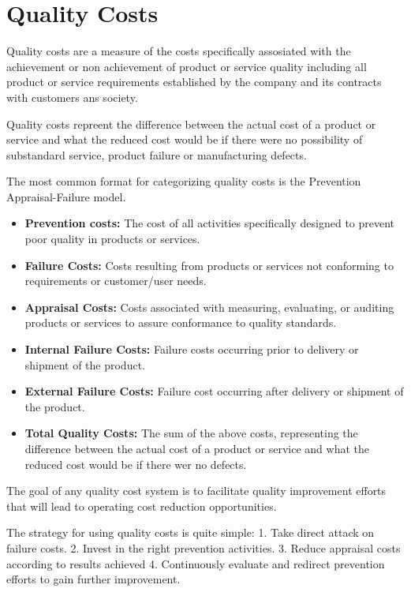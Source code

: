 \documentclass[11pt]{article}
\providecommand{\tightlist}{%
      \setlength{\itemsep}{0pt}\setlength{\parskip}{0pt}}
\begin{document}
    \hypertarget{quality-costs}{%
\section{Quality Costs}\label{quality-costs}}

    Quality costs are a measure of the costs specifically assosiated with
the achievement or non achievement of product or service quality
including all product or service requirements established by the company
and its contracts with customers ans society.

Quality costs repreent the difference between the actual cost of a
product or service and what the reduced cost would be if there were no
possibility of substandard service, product failure or manufacturing
defects.

The most common format for categorizing quality costs is the Prevention
Appraisal-Failure model.

\begin{itemize}
\tightlist
\item
  \textbf{Prevention costs:} The cost of all activities specifically
  designed to prevent poor quality in products or services.
\item
  \textbf{Failure Costs:} Costs resulting from products or services not
  conforming to requirements or customer/user needs.
\item
  \textbf{Appraisal Costs:} Costs associated with measuring, evaluating,
  or auditing products or services to assure conformance to quality
  standards.
\item
  \textbf{Internal Failure Costs:} Failure costs occurring prior to
  delivery or shipment of the product.
\item
  \textbf{External Failure Costs:} Failure cost occurring after delivery
  or shipment of the product.
\item
  \textbf{Total Quality Costs:} The sum of the above costs, representing
  the difference between the actual cost of a product or service and
  what the reduced cost would be if there wer no defects.
\end{itemize}



The goal of any quality cost system is to facilitate quality improvement
efforts that will lead to operating cost reduction opportunities.

The strategy for using quality costs is quite simple: 1. Take direct
attack on failure costs. 2. Invest in the right prevention activities.
3. Reduce appraisal costs according to results achieved 4. Continuously
evaluate and redirect prevention efforts to gain further improvement.
\end{document}
